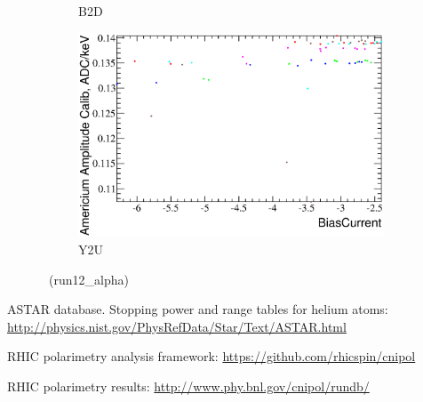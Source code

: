 \documentclass[a4paper,12pt]{article}
\begin{document}
\begin{figure}[h]
\begin{subfigure}[b]{0.5\textwidth}
\caption{B2D}
\end{subfigure}
\begin{subfigure}[b]{0.5\textwidth}
\includegraphics[width=\textwidth]{gfx/run12_alpha/Y2U/c_hBiasCurrent_AmGain.eps}
\caption{Y2U}
\end{subfigure}
%
\caption{\bcvsgainlabel\ (run12\_alpha)}
\end{figure}


\clearpage
\begin{thebibliography}{99} %

ASTAR database. Stopping power and range tables for helium atoms:
\url{http://physics.nist.gov/PhysRefData/Star/Text/ASTAR.html}

RHIC polarimetry analysis framework: \url{https://github.com/rhicspin/cnipol}

RHIC polarimetry results: \url{http://www.phy.bnl.gov/cnipol/rundb/}

\end{thebibliography}
\end{document}
